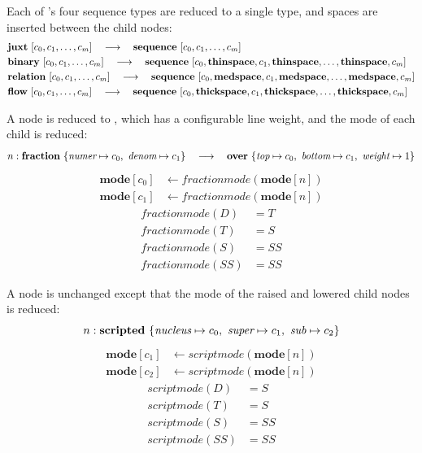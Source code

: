 \vspace{12pt}
Each of 's four sequence types are reduced to a single type, and spaces are inserted between the child nodes:
\begin{align*}
& {\mathbf{juxt}~[  c_0, c_1, \dots, c_m  ]}
 	\quad \longrightarrow \quad
	 {\mathbf{sequence}~[  c_0, c_1, \dots, c_m  ]}
\\
& {\mathbf{binary}~[  c_0, c_1, \dots, c_m  ]}
 	\quad \longrightarrow \quad
	 {\mathbf{sequence}~[  c_0, \textbf{thinspace}, c_1, \textbf{thinspace}, \dots,\textbf{thinspace}, c_m  ]}
\\
& {\mathbf{relation}~[  c_0, c_1, \dots, c_m  ]}
 	\quad \longrightarrow \quad
	 {\mathbf{sequence}~[  c_0, \textbf{medspace}, c_1, \textbf{medspace}, \dots,\textbf{medspace}, c_m  ]}
\\
& {\mathbf{flow}~[  c_0, c_1, \dots, c_m  ]}
 	\quad \longrightarrow \quad
	 {\mathbf{sequence}~[  c_0, \textbf{thickspace}, c_1, \textbf{thickspace}, \dots,\textbf{thickspace}, c_m  ]}
\end{align*}


\vspace{12pt}
A  node is reduced to , which has a configurable line weight, and the mode of each child is reduced:
$$
n: {\mathbf{fraction}~\{  {\textit{numer} \mapsto c_0},~{\textit{denom} \mapsto c_1}  \}} 
 	\quad \longrightarrow \quad
	{\mathbf{over}~\{   {\textit{top} \mapsto c_0} ,~ {\textit{bottom} \mapsto c_1} ,~ {\textit{weight} \mapsto 1}   \}}
$$
\begin{align*}
\mathbf{mode}[c_0] & \leftarrow \mathit{fractionmode}(\mathbf{mode}[n])
\\
\mathbf{mode}[c_1] & \leftarrow \mathit{fractionmode}(\mathbf{mode}[n])
\end{align*}
\begin{align*}
\mathit{fractionmode}(D) & = T
\\
\mathit{fractionmode}(T) & = S
\\
\mathit{fractionmode}(S) & = SS
\\
\mathit{fractionmode}(SS) & = SS
\end{align*}

\vspace{12pt}
A  node is unchanged except that the mode of the raised and lowered child nodes is reduced:
$$
n: {\mathbf{scripted}~\{  {\textit{nucleus} \mapsto c_0},~ 
							{\textit{super} \mapsto c_1},~
							{\textit{sub} \mapsto c_2}  \}} 
$$
\begin{align*}
\mathbf{mode}[c_1] &\leftarrow \mathit{scriptmode}(\mathbf{mode}[n])
\\
\mathbf{mode}[c_2] &\leftarrow \mathit{scriptmode}(\mathbf{mode}[n])
\end{align*}
\begin{align*}
\mathit{scriptmode}(D) &= S
\\
\mathit{scriptmode}(T) &= S
\\
\mathit{scriptmode}(S) &= SS
\\
\mathit{scriptmode}(SS) &= SS
\end{align*}


